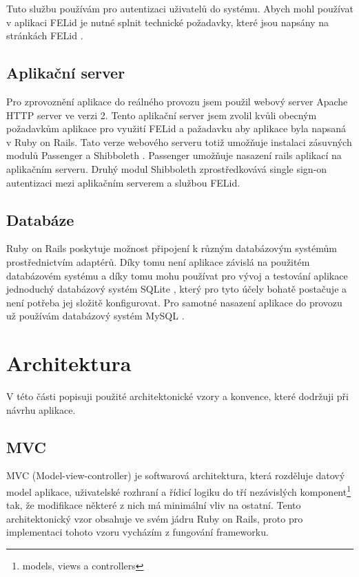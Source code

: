 Tuto službu používám pro autentizaci uživatelů do systému. Abych mohl používat v aplikaci FELid je nutné splnit technické požadavky, které jsou napsány na stránkách FELid \cite{felid_pozadavky}.

\subsection{Aplikační server}
\label{apache}
Pro zprovoznění aplikace do reálného provozu jsem použil webový server Apache HTTP server \cite{apache} ve verzi 2. Tento aplikační server jsem zvolil kvůli obecným požadavkům aplikace pro využití FELid a pažadavku aby aplikace byla napsaná v Ruby on Rails. Tato verze webového serveru totiž umožňuje instalaci zásuvných modulů Passenger \cite{passenger} a Shibboleth \cite{shibboleth}. Passenger umožňuje nasazení rails aplikací na aplikačním serveru. Druhý modul Shibboleth zprostředkovává single sign-on autentizaci mezi aplikačním serverem a službou FELid.

\subsection{Databáze}
Ruby on Rails poskytuje možnost připojení k různým databázovým systémům prostřednictvím adaptérů. Díky tomu není aplikace závislá na použitém databázovém systému a díky tomu mohu používat pro vývoj a testování aplikace jednoduchý databázový systém SQLite \cite{sqlite}, který pro tyto účely bohatě postačuje a není potřeba jej složitě konfigurovat. Pro samotné nasazení aplikace do provozu už používám databázový systém MySQL \cite{mysql}.

\section{Architektura}
V této části popisuji použité architektonické vzory a konvence, které dodržuji při návrhu aplikace.

\subsection{MVC}
\label{mvc}
MVC (Model-view-controller) \cite{mvc} je softwarová architektura, která rozděluje datový model aplikace, uživatelské rozhraní a řídicí logiku do tří nezávislých komponent\footnote{models, views a controllers} tak, že modifikace některé z nich má minimální vliv na ostatní. Tento architektonický vzor obsahuje ve svém jádru Ruby on Rails, proto pro implementaci tohoto vzoru vycházím z fungování frameworku.

